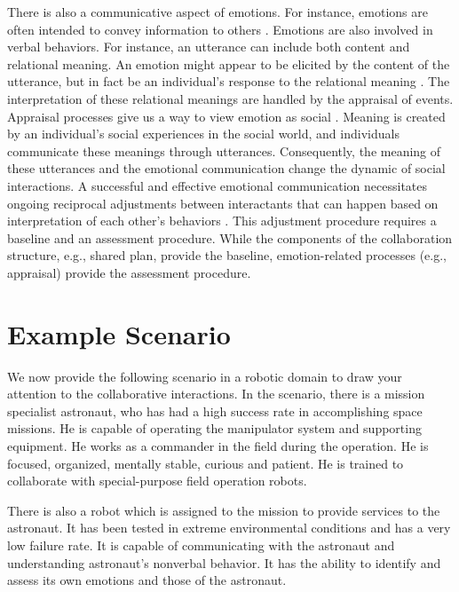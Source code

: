 \documentclass[12pt]{report}
\begin{document}
There is also a communicative aspect of emotions. For instance, emotions are
often intended to convey information to others \cite{goffman:self-presentation}.
Emotions are also involved in verbal behaviors. For instance, an utterance can
include both content and relational meaning. An emotion might appear to be
elicited by the content of the utterance, but in fact be an individual's
response to the relational meaning \cite{planalp:communicating-emotion}. The
interpretation of these relational meanings are handled by the appraisal of
events. Appraisal processes give us a way to view emotion as social
\cite{hooft:sharing-emotions}. Meaning is created by an individual's social
experiences in the social world, and individuals communicate these meanings
through utterances. Consequently, the meaning of these utterances and the
emotional communication change the dynamic of social interactions. A successful
and effective emotional communication necessitates ongoing reciprocal
adjustments between interactants that can happen based on interpretation of each
other's behaviors \cite{parkinson:emotion-social-interaction}. This adjustment
procedure requires a baseline and an assessment procedure. While the components
of the collaboration structure, e.g., shared plan, provide the baseline,
emotion-related processes (e.g., appraisal) provide the assessment procedure.

\section{Example Scenario}
\label{sec:example-scenario}
We now provide the following scenario in a robotic domain to draw your attention
to the collaborative interactions. In the scenario, there is a mission
specialist astronaut, who has had a high success rate in accomplishing space
missions. He is capable of operating the manipulator system and supporting
equipment. He works as a commander in the field during the operation. He is
focused, organized, mentally stable, curious and patient. He is trained to
collaborate with special-purpose field operation robots.

There is also a robot which is assigned to the mission to provide services to
the astronaut. It has been tested in extreme environmental conditions and has
a very low failure rate. It is capable of communicating with the astronaut and
understanding astronaut's nonverbal behavior. It has the ability to identify and
assess its own emotions and those of the astronaut.
\end{document}
